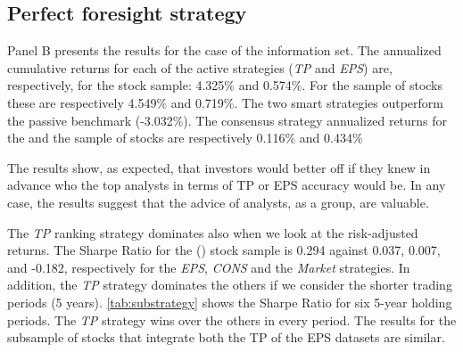 \documentclass[a4paper,twoside,12pt,openright,notitlepage]{report}\usepackage[]{graphicx}\usepackage[]{color}
\begin{document}
\subsection{Perfect foresight strategy}
\label{ch1-sec:perfect}
Panel B presents the results for the case of the \tr{} information set. The annualized cumulative returns for each of the active strategies (\textit{TP} and \textit{EPS}) are, respectively, for the \all{} stock sample: 4.325\% and  0.574\%. For the \same{} sample of stocks these are respectively 4.549\% and 0.719\%. The two smart strategies outperform the passive benchmark (-3.032\%).  The consensus strategy annualized returns for the \all{} and the \same{} sample of stocks are respectively   0.116\% and  0.434\%


The results show, as expected, that  investors would better off if they knew in advance who the top analysts in terms of TP or EPS accuracy would be. In any case, the results suggest that the advice of analysts, as a group, are valuable.


The \textit{TP} ranking strategy dominates also when we look at the risk-adjusted returns. The Sharpe Ratio for the \all{} (\same{}) stock sample is 0.294 against 0.037, 0.007, and -0.182, respectively for  the \textit{EPS}, \textit{CONS} and the \textit{Market} strategies. In addition, the \textit{TP} strategy dominates  the others if we consider the shorter trading periods (5 years). \ref{tab:substrategy} shows the Sharpe Ratio for six 5-year holding periods. The \textit{TP} strategy wins over the others in every period. The results for the subsample of stocks that integrate both the TP of the EPS datasets are similar.
\end{document}
